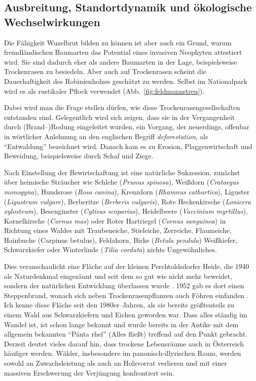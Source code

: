 \documentclass[twocolumn]{scrartcl}
\begin{document}
\subsection{Ausbreitung, Standortdynamik und ökologische Wechselwirkungen}

Die Fähigkeit Wuzelbrut bilden zu können ist aber auch ein Grund,
warum fremdländischen Baumarten das Potential eines invasiven
Neophyten attestiert wird. Sie sind dadurch eher als andere Baumarten
in der Lage, beispielsweise Trockenrasen zu besiedeln. Aber auch auf
Trockenrasen scheint die Dauerhaftigkeit des Robinienholzes geschätzt
zu werden. Selbst im Nationalpark wird es als rustikaler Pflock
verwendet (Abb.~\ref{fig:feldmannstreu}).

Dabei wird man die Frage stellen dürfen, wie diese
Trockenrasengesellschaften entstanden sind. Gelegentlich wird sich
zeigen, dass sie in der Vergangenheit durch (Brand--)Rodung
eingeleitet wurden, ein Vorgang, der neuerdings, offenbar in
wörtlicher Anlehnung an den englischen Begriff \emph{deforestation},
als \enquote{Entwaldung} bezeichnet wird. Danach kam es zu Erosion,
Plaggenwirtschaft und Beweidung, beispielsweise durch Schaf und Ziege.

Nach Einstellung der Bewirtschaftung ist eine natürliche Sukzession,
zunächst über heimische Sträucher wie Schlehe (\emph{Prunus spinosa}),
Weißdorn (\emph{Crataegus monogyna}), Hundsrose (\emph{Rosa canina}),
Kreuzdorn (\emph{Rhamnus cathartica}), Liguster (\emph{Ligustrum
vulgare}), Berberitze (\emph{Berberis vulgaris}), Rote Heckenkirsche
(\emph{Lonicera xylosteum}), Besenginster (\emph{Cytisus scoparius}),
Heidelbeere (\emph{Vaccinium myrtillus}), Kornelkirsche (\emph{Cornus
mas}) oder Roter Hartriegel (\emph{Cornus sanguinea}) in Richtung
eines Waldes mit Traubeneiche, Stieleiche, Zerreiche, Flaumeiche,
Hainbuche (Carpinus betulus), Feldahorn, Birke (\emph{Betula pendula})
Weißkiefer, Schwarzkiefer oder Winterlinde (\emph{Tilia cordata})
nichts Ungewöhnliches.

Dies veranschaulicht eine Fläche auf der kleinen Perchtoldsdorfer
Heide, die 1940 als Naturdenkmal eingezäunt und seit dem so gut wie
nicht mehr beweidet, sondern der natürlichen Entwicklung überlassen
wurde \citep{rosenkranz1953heide}. 1952 gab es dort einen
Steppenbrand, wonach sich neben Trockenrasenpflanzen auch Föhren
einfanden \citep{rosenkranz1953heideBrand}. Ich kenne diese Fläche
seit den 1980er--Jahren, als sie bereits größtenteils zu einem Wald
aus Schwarzkiefern und Eichen geworden war.  Dass alles ständig im
Wandel ist, ist schon lange bekannt und wurde bereits in der Antike
mit dem allgemein bekannten \enquote{Pánta rheî} (Alles fließt)
treffend auf den Punkt gebracht.  Derzeit deutet vieles darauf hin,
dass trockene Lebensräume auch in Österreich häufiger werden. Wälder,
insbesondere im panonisch-illyrischen Raum, werden sowohl an
Zuwachsleistung als auch an Holzvorrat verlieren und mit einer
massiven Erschwerung der Verjüngung konfrontiert sein.
\end{document}
